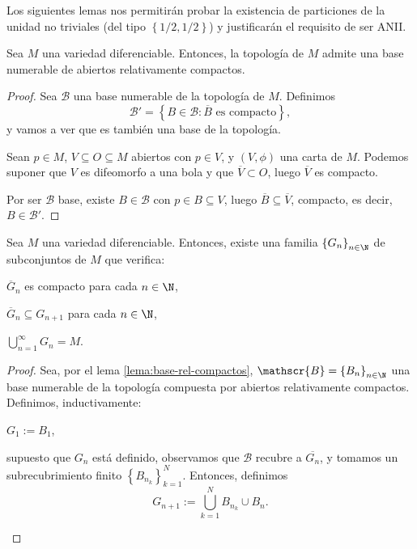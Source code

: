 Los siguientes lemas nos permitirán probar la existencia de particiones de la unidad
no triviales (del tipo $\left\{ 1/2, 1/2 \right\}$) y justificarán el requisito
de ser ANII.
\begin{lema} \label{lema:base-rel-compactos}
  Sea $M$ una variedad diferenciable. Entonces, la topología de $M$ admite una
  base numerable de abiertos relativamente compactos.
\end{lema}
\begin{proof}
  Sea $\mathscr{B}$ una base numerable de la topología de $M$. Definimos
  \[
    \mathscr{B}' = \left\{ B\in \mathscr{B} : \overline{B} \text{ es compacto} \right\}
  ,\]
  y vamos a ver que es también una base de la topología.

  Sean $p\in M$, $V\subseteq O\subseteq M$ abiertos con $p\in V$, y $(V,\phi)$
  una carta de $M$. Podemos suponer que $V$ es difeomorfo a una bola y que
  $\overline{V}\subset O$, luego $\overline{V}$ es compacto.

  Por ser $\mathscr{B}$ base, existe $B\in\mathscr{B}$ con $p\in B\subseteq V$,
  luego $\overline{B}\subseteq\overline{V}$, compacto, es decir, $B\in\mathscr{B}'$.
\end{proof}
\begin{lema} \label{lema:rel-compactos}
  Sea $M$ una variedad diferenciable. Entonces, existe una familia
  $\left\{ G_{n} \right\}_{n\in\N}$ de subconjuntos de $M$ que verifica:
  \begin{nlist}
  \item
    $\overline{G}_{n}$ es compacto para cada $n\in\N$,
  \item
    $\overline{G}_{n}\subseteq G_{n+1}$ para cada $n\in\N$,
  \item
    $\bigcup_{n=1}^{\infty} G_{n} = M$.
  \end{nlist}
\end{lema}
\begin{proof}
  Sea, por el lema \ref{lema:base-rel-compactos},
  $\mathscr{B} = \left\{ B_{n} \right\}_{n\in\N}$ una base numerable de la
  topología compuesta por abiertos relativamente compactos. Definimos,
  inductivamente:
  \begin{nlist}
  \item
    $G_{1} := B_{1}$,
  \item
    supuesto que $G_{n}$ está definido, observamos que $\mathscr{B}$ recubre a
    $\overline{G_{n}}$, y tomamos un subrecubrimiento finito $\left\{ B_{n_{k}}
    \right\}_{k=1}^{N}$. Entonces, definimos
    \[
      G_{n+1} := \bigcup_{k=1}^{N} B_{n_{k}} \cup B_{n}
    .\]
  \end{nlist}
\end{proof}

